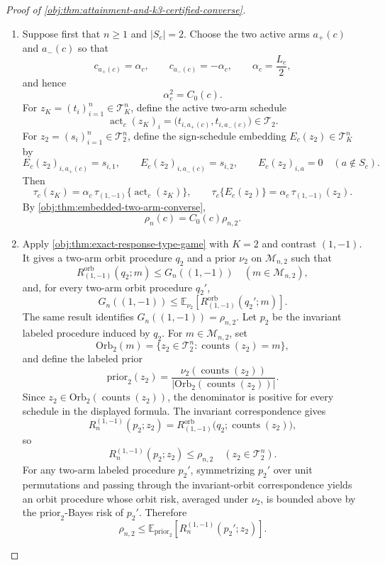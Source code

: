 \begin{proof}[Proof of \cref{obj:thm:attainment-and-k3-certified-converse}]
\begin{enumerate}
\item Suppose first that \(n\ge 1\) and \(|S_c|=2\). Choose the two active arms \(a_+(c)\) and \(a_-(c)\) so that
\[
c_{a_+(c)}=\alpha_c,\qquad c_{a_-(c)}=-\alpha_c,\qquad
\alpha_c=\frac{L_c}{2},
\]
and hence
\[
\alpha_c^2=C_0(c).
\]
For \(z_K=(t_i)_{i=1}^n\in\mathcal T_K^n\), define the active two-arm schedule
\[
\operatorname{act}_c(z_K)_i
=
\bigl(t_{i,a_+(c)},t_{i,a_-(c)}\bigr)\in\mathcal T_2.
\]
For \(z_2=(s_i)_{i=1}^n\in\mathcal T_2^n\), define the sign-schedule embedding \(E_c(z_2)\in\mathcal T_K^n\) by
\[
E_c(z_2)_{i,a_+(c)}=s_{i,1},\qquad
E_c(z_2)_{i,a_-(c)}=s_{i,2},\qquad
E_c(z_2)_{i,a}=0\quad(a\notin S_c).
\]
Then
\[
\tau_c(z_K)
=
\alpha_c\,\tau_{(1,-1)}\{\operatorname{act}_c(z_K)\},
\qquad
\tau_c\{E_c(z_2)\}
=
\alpha_c\,\tau_{(1,-1)}(z_2).
\]
By \cref{obj:thm:embedded-two-arm-converse},
\[
\rho_n(c)=C_0(c)\rho_{n,2}.
\]

\item Apply \cref{obj:thm:exact-response-type-game} with \(K=2\) and contrast \((1,-1)\). It gives a two-arm orbit procedure \(q_2\) and a prior \(\nu_2\) on \(\mathcal M_{n,2}\) such that
\[
R^{\mathrm{orb}}_{(1,-1)}(q_2;m)\le G_n((1,-1))
\quad(m\in\mathcal M_{n,2}),
\]
and, for every two-arm orbit procedure \(q_2'\),
\[
G_n((1,-1))
\le
\mathbb E_{\nu_2}\!\left[
R^{\mathrm{orb}}_{(1,-1)}(q_2';m)
\right].
\]
The same result identifies \(G_n((1,-1))=\rho_{n,2}\). Let \(p_2\) be the invariant labeled procedure induced by \(q_2\). For \(m\in\mathcal M_{n,2}\), set
\[
\mathrm{Orb}_2(m)
=
\{z_2\in\mathcal T_2^n:\operatorname{counts}(z_2)=m\},
\]
and define the labeled prior
\[
\mathrm{prior}_2(z_2)
=
\frac{\nu_2(\operatorname{counts}(z_2))}
{|\mathrm{Orb}_2(\operatorname{counts}(z_2))|}.
\]
Since \(z_2\in \mathrm{Orb}_2(\operatorname{counts}(z_2))\), the denominator is positive for every schedule in the displayed formula. The invariant correspondence gives
\[
R_n^{(1,-1)}(p_2;z_2)
=
R^{\mathrm{orb}}_{(1,-1)}
\bigl(q_2;\operatorname{counts}(z_2)\bigr),
\]
so
\[
R_n^{(1,-1)}(p_2;z_2)\le \rho_{n,2}
\quad(z_2\in\mathcal T_2^n).
\]
For any two-arm labeled procedure \(p_2'\), symmetrizing \(p_2'\) over unit permutations and passing through the invariant-orbit correspondence yields an orbit procedure whose orbit risk, averaged under \(\nu_2\), is bounded above by the \(\mathrm{prior}_2\)-Bayes risk of \(p_2'\). Therefore
\[
\rho_{n,2}
\le
\mathbb E_{\mathrm{prior}_2}\!\left[
R_n^{(1,-1)}(p_2';z_2)
\right].
\]


\end{enumerate}
\end{proof}
